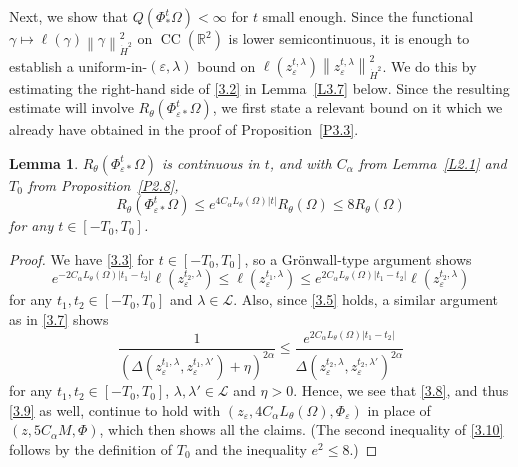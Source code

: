 \documentclass[reqno,centertags,12pt]{amsart}
\newtheorem{lemma}[theorem]{Lemma}
\theoremstyle{definition}
\numberwithin{equation}{section}
\newcommand{\abs}[1]{\left\lvert#1\right\rvert}
\newcommand{\norm}[1]{\left\|#1\right\|}
\newcommand{\bbR}{{\mathbb{R}}}
\newcommand{\eps}{\varepsilon}
\newcommand{\tht}{\theta}
\begin{document}
Next, we show that $Q(\Phi_{*}^{t}\Omega) < \infty$ for $t$ small enough.
Since the functional $\gamma\mapsto \ell(\gamma)\norm{\gamma}_{\dot{H}^{2}}^{2}$
on $\operatorname{CC}(\bbR^{2})$ is lower semicontinuous,
it is enough to establish a uniform-in-$(\eps,\lambda)$ bound on
$\ell(z_{\eps}^{t,\lambda})\norm{z_{\eps}^{t,\lambda}}_{\dot{H}^{2}}^{2}$.
We do this by estimating the right-hand side of \eqref{3.2}
in Lemma~\ref{L3.7} below. Since the resulting estimate will involve
$R_{\tht}(\Phi_{\eps*}^{t}\Omega)$, we first state a relevant bound on it
which we already have obtained in the proof of Proposition~\ref{P3.3}.

\begin{lemma}\label{L3.4}
    $R_{\tht}(\Phi_{\eps*}^{t}\Omega)$ is continuous in $t$, and with
    $C_{\alpha}$ from Lemma~\ref{L2.1} and $T_{0}$ from Proposition~\ref{P2.8},
    \begin{equation}\label{3.10}
        R_{\tht}(\Phi_{\eps*}^{t}\Omega) \leq e^{4C_{\alpha}L_{\tht}(\Omega)\abs{t}}R_{\tht}(\Omega)
        \leq 8R_{\tht}(\Omega)
    \end{equation}
    for any $t\in[-T_{0},T_{0}]$.
\end{lemma}

\begin{proof}
    We have \eqref{3.3} for $t\in[-T_{0},T_{0}]$, so a Gr\"{o}nwall-type argument shows
    \[
        e^{-2C_{\alpha}L_{\tht}(\Omega)\abs{t_{1} - t_{2}}}\ell(z_{\eps}^{t_{2},\lambda})
        \leq \ell(z_{\eps}^{t_{1},\lambda}) \leq
        e^{2C_{\alpha}L_{\tht}(\Omega)\abs{t_{1} - t_{2}}}\ell(z_{\eps}^{t_{2},\lambda})
    \]
    for any $t_{1},t_{2}\in[-T_{0},T_{0}]$ and $\lambda\in\mathcal{L}$.
    Also, since \eqref{3.5} holds, a similar argument as in \eqref{3.7} shows
    \[
        \frac{1}{\left(
            \Delta(z_{\eps}^{t_{1},\lambda},z_{\eps}^{t_{1},\lambda'}) + \eta
        \right)^{2\alpha}}
        \leq \frac{e^{2C_{\alpha}L_{\tht}(\Omega)\abs{t_{1} - t_{2}}}}
        {\Delta(z_{\eps}^{t_{2},\lambda},z_{\eps}^{t_{2},\lambda'})^{2\alpha}}
    \]
    for any $t_{1},t_{2}\in[-T_{0},T_{0}]$, $\lambda,\lambda'\in\mathcal{L}$ and $\eta>0$.
    Hence, we see that \eqref{3.8}, and thus \eqref{3.9} as well, continue to hold with
    $(z_{\eps},4C_{\alpha}L_{\tht}(\Omega),\Phi_{\eps})$ in place of $(z,5C_{\alpha}M,\Phi)$,
    which then shows all the claims.
    (The second inequality of \eqref{3.10} follows by the definition of $T_{0}$
    and the inequality $e^{2}\leq 8$.)
\end{proof}
\end{document}
